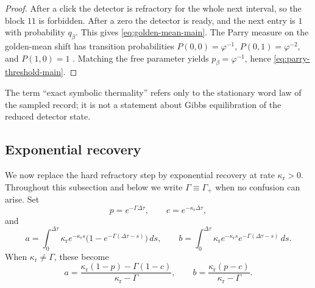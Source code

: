 \documentclass[11pt]{amsart}
\numberwithin{equation}{section}
\theoremstyle{remark}
\begin{document}
\begin{proof}
After a click the detector is refractory for the whole next interval, so the block $11$ is forbidden. After a zero the detector is ready, and the next entry is $1$ with probability $q_\beta$. This gives \eqref{eq:golden-mean-main}. The Parry measure on the golden-mean shift has transition probabilities $P(0,0)=\varphi^{-1}$, $P(0,1)=\varphi^{-2}$, and $P(1,0)=1$ \cite{Parry1964,LindMarcus1995}. Matching the free parameter yields $p_\beta=\varphi^{-1}$, hence \eqref{eq:parry-threshold-main}.
\end{proof}

The term ``exact symbolic thermality'' refers only to the stationary word law of the sampled record; it is not a statement about Gibbs equilibration of the reduced detector state.

\subsection{Exponential recovery}

We now replace the hard refractory step by exponential recovery at rate $\kappa_{\mathrm r}>0$. Throughout this subsection and below we write $\Gamma\equiv\Gamma_+$ when no confusion can arise. Set
\begin{equation}\label{eq:p-c-main}
p=e^{-\Gamma\Delta\tau}, \qquad c=e^{-\kappa_{\mathrm r}\Delta\tau},
\end{equation}
and
\begin{equation}\label{eq:a-b-main}
a=\int_0^{\Delta\tau}\kappa_{\mathrm r}e^{-\kappa_{\mathrm r}s}\bigl(1-e^{-\Gamma(\Delta\tau-s)}\bigr)\,ds,
\qquad
b=\int_0^{\Delta\tau}\kappa_{\mathrm r}e^{-\kappa_{\mathrm r}s}e^{-\Gamma(\Delta\tau-s)}\,ds.
\end{equation}
When $\kappa_{\mathrm r}\neq\Gamma$, these become
\[
a=\frac{\kappa_{\mathrm r}(1-p)-\Gamma(1-c)}{\kappa_{\mathrm r}-\Gamma},
\qquad
b=\frac{\kappa_{\mathrm r}(p-c)}{\kappa_{\mathrm r}-\Gamma}.
\]
\end{document}
